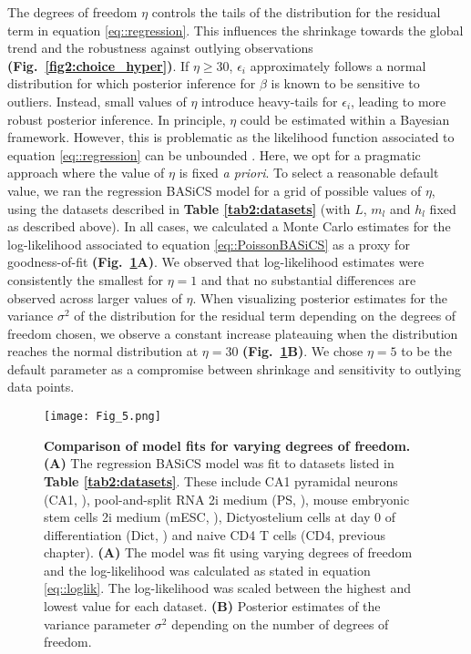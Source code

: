 \newpage

The degrees of freedom $\eta$ controls the tails of the distribution for the residual term in equation \eqref{eq::regression}. This influences the shrinkage towards the global trend and the robustness against outlying observations \textbf{(Fig.~\ref{fig2:choice_hyper})}.  If $\eta \geq 30$, $\epsilon_i$ approximately follows a normal distribution for which posterior inference for $\beta$ is known to be sensitive to outliers. Instead, small values of $\eta$ introduce heavy-tails for $\epsilon_i$, leading to more robust posterior inference. In principle, $\eta$ could be estimated within a Bayesian framework. However, this is problematic as the likelihood function associated to equation \eqref{eq::regression} can be unbounded \citep{Fernandez1999}. Here, we opt for a pragmatic approach where the value of $\eta$ is fixed \emph{a priori}. To select a reasonable default value, we ran the regression BASiCS model for a grid of possible values of $\eta$, using the datasets described in \textbf{Table \ref{tab2:datasets}} (with $L$, $m_l$ and $h_l$ fixed as described above). In all cases, we calculated a Monte Carlo estimates for the log-likelihood associated to equation \eqref{eq::PoissonBASiCS} as a proxy for goodness-of-fit \textbf{(Fig.~\ref{fig2:DoF}A)}. We observed that log-likelihood estimates were consistently the smallest for $\eta=1$ and that no substantial differences are observed across larger values of $\eta$. When visualizing posterior estimates for the variance $\sigma^2$ of the distribution for the residual term depending on the degrees of freedom chosen, we observe a constant increase plateauing when the distribution reaches the normal distribution at $\eta=30$ \textbf{(Fig.~\ref{fig2:DoF}B)}. We chose $\eta=5$ to be the default parameter as a compromise between shrinkage and sensitivity to outlying data points. 

\begin{figure}[!h]
\centering
\texttt{[image: Fig\_5.png]}
\caption[Comparison of model fits for varying degrees of freedom]{\textbf{Comparison of model fits for varying degrees of freedom.}\\
\textbf{(A)} The regression BASiCS model was fit to datasets listed in \textbf{Table \ref{tab2:datasets}}. These include CA1 pyramidal neurons (CA1, \citep{Zeisel2015}), pool-and-split RNA 2i medium (PS, \citep{Grun2014}), mouse embryonic stem cells 2i medium (mESC, \citep{Grun2014}), Dictyostelium cells at day 0 of differentiation (Dict, \citep{Antolovic2017}) and naive CD4\plus{} T cells (CD4, previous chapter). \textbf{(A)} The model was fit using varying degrees of freedom and the log-likelihood was calculated as stated in equation \eqref{eq::loglik}. The log-likelihood was scaled between the highest and lowest value for each dataset. \textbf{(B)} Posterior estimates of the variance parameter $\sigma^2$ depending on the number of degrees of freedom.}
\label{fig2:DoF}
\end{figure}

